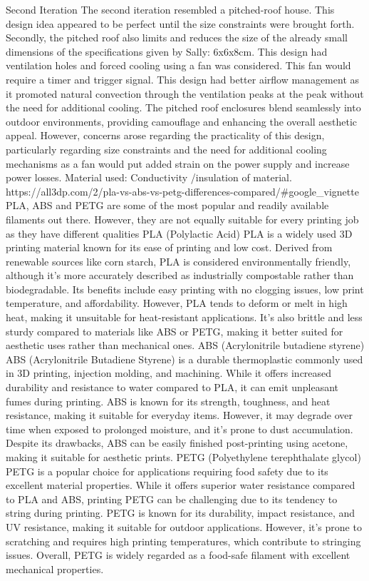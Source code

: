 Second Iteration 
The second iteration resembled a pitched-roof house. This design idea appeared to be perfect until the size constraints were brought forth. Secondly, the pitched roof also limits and reduces the size of the already small dimensions of the specifications given by Sally: 6x6x8cm. 
This design had ventilation holes and forced cooling using a fan was considered. This fan would require a timer and trigger signal. This design had better airflow management as it promoted natural convection through the ventilation peaks at the peak without the need for additional cooling. The pitched roof enclosures blend seamlessly into outdoor environments, providing camouflage and enhancing the overall aesthetic appeal. However, concerns arose regarding the practicality of this design, particularly regarding size constraints and the need for additional cooling mechanisms as a fan would put added strain on the power supply and increase power losses.
Material used: Conductivity /insulation of material.
https://all3dp.com/2/pla-vs-abs-vs-petg-differences-compared/#google_vignette  
PLA, ABS and PETG are some of the most popular and readily available filaments out there. However, they are not equally suitable for every printing job as they have different qualities 
PLA (Polylactic Acid)
PLA is a widely used 3D printing material known for its ease of printing and low cost. Derived from renewable sources like corn starch, PLA is considered environmentally friendly, although it's more accurately described as industrially compostable rather than biodegradable. Its benefits include easy printing with no clogging issues, low print temperature, and affordability. However, PLA tends to deform or melt in high heat, making it unsuitable for heat-resistant applications. It's also brittle and less sturdy compared to materials like ABS or PETG, making it better suited for aesthetic uses rather than mechanical ones.
ABS (Acrylonitrile butadiene styrene)
ABS (Acrylonitrile Butadiene Styrene) is a durable thermoplastic commonly used in 3D printing, injection molding, and machining. While it offers increased durability and resistance to water compared to PLA, it can emit unpleasant fumes during printing. ABS is known for its strength, toughness, and heat resistance, making it suitable for everyday items. However, it may degrade over time when exposed to prolonged moisture, and it's prone to dust accumulation. Despite its drawbacks, ABS can be easily finished post-printing using acetone, making it suitable for aesthetic prints.
PETG (Polyethylene terephthalate glycol)
PETG is a popular choice for applications requiring food safety due to its excellent material properties. While it offers superior water resistance compared to PLA and ABS, printing PETG can be challenging due to its tendency to string during printing. PETG is known for its durability, impact resistance, and UV resistance, making it suitable for outdoor applications. However, it's prone to scratching and requires high printing temperatures, which contribute to stringing issues. Overall, PETG is widely regarded as a food-safe filament with excellent mechanical properties.

